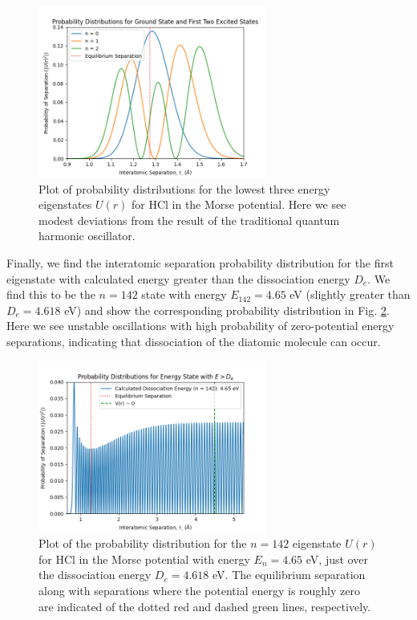\documentclass[%
aps, %
prl, %
preprint, %
12pt, %
amsfonts, %
amssymb, %
amsmath, %
endfloats,%
raggedbottom, %
]{revtex4-1}
\begin{document}
\begin{figure}
\centering
\includegraphics[width=0.67\textwidth]{morse_prob_distribs.png}
\caption{\label{fig:MorseProbDistrib} Plot of probability distributions for the lowest three energy
eigenstates $U(r)$ for HCl in the Morse potential. Here we see modest deviations from the result of the
traditional quantum harmonic oscillator.}
\end{figure}

Finally, we find the interatomic separation probability distribution for the first eigenstate with
calculated energy greater than the dissociation energy $D_e$. We find this to be the $n = 142$ state
with energy $E_{142} = 4.65$ eV (slightly greater than $D_e = 4.618$ eV) and show the corresponding
probability distribution in Fig. \ref{fig:DissocProbDistrib}. Here we see unstable oscillations with
high probability of zero-potential energy separations, indicating that dissociation of the diatomic
molecule can occur.

\begin{figure}
\centering
\includegraphics[width=0.67\textwidth]{dissoc_prob_distrib.png}
\caption{\label{fig:DissocProbDistrib} Plot of the probability distribution for the $n = 142$
eigenstate $U(r)$ for HCl in the Morse potential with energy $E_n = 4.65$ eV, just over the
dissociation energy $D_e = 4.618$ eV. The equilibrium separation along with separations where the
potential energy is roughly zero are indicated of the dotted red and dashed green lines, respectively.}
\end{figure}
\end{document}
